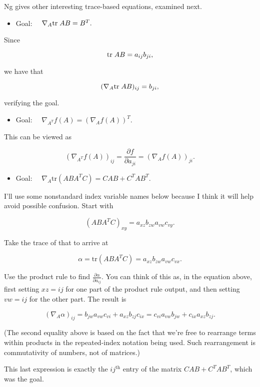 \documentclass[]{article}
\providecommand{\tightlist}{%
  \setlength{\itemsep}{0pt}\setlength{\parskip}{0pt}}
\begin{document}
Ng gives other interesting trace-based equations, examined next.

\begin{itemize}
\tightlist
\item
  Goal: \(\quad \nabla_A\text{tr}\; AB = B^T.\)
\end{itemize}

Since

\[\text{tr}\; AB = a_{ij}b_{ji},\]

we have that

\[(\nabla_A\text{tr}\; AB)_{ij} = b_{ji},\]

verifying the goal.

\begin{itemize}
\tightlist
\item
  Goal: \(\quad \nabla_{A^T}f(A) = (\nabla_A f(A))^T.\)
\end{itemize}

This can be viewed as

\[(\nabla_{A^T}f(A))_{ij} = \frac{\partial f}{\partial a_{ji}}
                          = (\nabla_A f(A))_{ji}.\]

\begin{itemize}
\tightlist
\item
  Goal: \(\quad \nabla_A\text{tr}(ABA^TC) = CAB + C^TAB^T.\)
\end{itemize}

I'll use some nonstandard index variable names below because I think it
will help avoid possible confusion. Start with

\[(ABA^TC)_{xy} = a_{xz} b_{zw} a_{vw} c_{vy}.\]

Take the trace of that to arrive at

\[\alpha = \text{tr}(ABA^TC) = a_{xz} b_{zw} a_{vw} c_{vx}.\]

Use the product rule to find \(\frac{\partial\alpha}{\partial a_{ij}}\).
You can think of this as, in the equation above, first setting
\(xz = ij\) for one part of the product rule output, and then setting
\(vw = ij\) for the other part. The result is

\[(\nabla_A\alpha)_{ij} = b_{jw} a_{vw} c_{vi} + a_{xz} b_{zj} c_{ix}
                        = c_{vi} a_{vw} b_{jw} + c_{ix} a_{xz} b_{zj}.\]

(The second equality above is based on the fact that we're free to
rearrange terms within products in the repeated-index notation being
used. Such rearrangement is commutativity of numbers, not of matrices.)

This last expression is exactly the \(ij^\text{th}\) entry of the matrix
\(CAB + C^TAB^T\), which was the goal.
\end{document}
